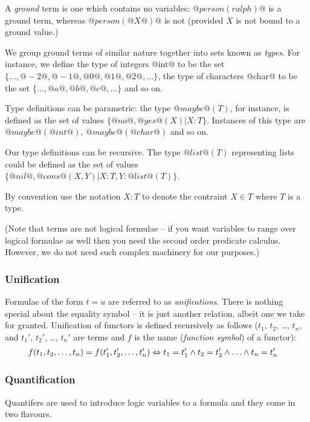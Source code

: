 A \emph{ground} term is one which contains no variables:
$@person(ralph)@$ is a ground term, whereas $@person(@X@)@$ is not
(provided $X$ is not bound to a ground value.)

We group ground terms of similar nature together into sets known as
\emph{types}.  For instance, we define the type of integers @int@ to
be the set $\{\ldots, @-2@, @-1@, @0@, @1@, @2@, \ldots\}$, the type of
characters @char@ to be the set $\{\ldots, @a@, @b@, @c@, \ldots\}$ and
so on.

Type definitions can be parametric: the type $@maybe@(T)$, for
instance, is defined as the set of values $\{@no@, @yes@(X) | X:T\}$.
Instances of this type are $@maybe@(@int@)$, $@maybe@(@char@)$ and so on.

Our type definitions can be recursive.  The type $@list@(T)$
representing lists could be defined as the set of values
$\{@nil@, @cons@(X, Y) | X:T, Y:@list@(T)\}$.

By convention use the notation $X:T$ to denote the contraint
$X \in T$ where $T$ is a type.

(Note that terms are not logical formulae -- if you want variables to
range over logical formulae as well then you need the second order
predicate calculus.  However, we do not need such complex machinery for
our purposes.)

\subsubsection{Unification}

Formulae of the form $t = u$ are referred to as \emph{unifications}.
There is nothing special about the equality symbol -- it is just another
relation, albeit one we take for granted.  Unification of functors is
defined recursively as follows ($t_1$, $t_2$, \ldots, $t_n$, and $t_1'$,
$t_2'$, \ldots, $t_n'$ are terms and $f$ is the name (\emph{function
symbol}) of a functor):
\begin{align*}
f(t_1, t_2, \ldots, t_n) = f(t_1', t_2', \ldots, t_n')
& \Leftrightarrow t_1 = t_1' \wedge t_2 = t_2' \wedge \ldots \wedge t_n = t_n'
\end{align*}

\subsubsection{Quantification}

Quantifers are used to introduce logic variables to a formula and they
come in two flavours.

